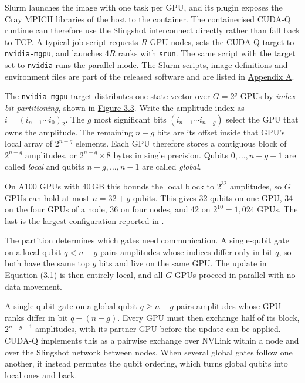 \documentclass{report}
\theoremstyle{plain}
\theoremstyle{definition}
\theoremstyle{remark}
\begin{document}
Slurm launches the image with one task per GPU, and its plugin exposes the Cray MPICH libraries of the host to the container. The containerised CUDA-Q runtime can therefore use the Slingshot interconnect directly rather than fall back to TCP. A typical job script requests $R$ GPU nodes, sets the CUDA-Q target to \texttt{nvidia-mgpu}, and launches $4R$ ranks with \texttt{srun}. The same script with the target set to \texttt{nvidia} runs the parallel mode. The Slurm scripts, image definitions and environment files are part of the released software \cite{guo2025qgearsoftware} and are listed in \hyperref[app:qgear]{Appendix A}.

The \texttt{nvidia-mgpu} target distributes one state vector over $G=2^{g}$ GPUs by \emph{index-bit partitioning}, shown in \hyperref[fig:qgear:partition]{Figure 3.3}. Write the amplitude index as $i=(i_{n-1}\cdots i_{0})_{2}$. The $g$ most significant bits $(i_{n-1}\cdots i_{n-g})$ select the GPU that owns the amplitude. The remaining $n-g$ bits are its offset inside that GPU's local array of $2^{n-g}$ elements. Each GPU therefore stores a contiguous block of $2^{n-g}$ amplitudes, or $2^{n-g}\times 8$ bytes in single precision. Qubits $0,\dots,n-g-1$ are called \emph{local} and qubits $n-g,\dots,n-1$ are called \emph{global}.

On A100 GPUs with 40 GB this bounds the local block to $2^{32}$ amplitudes, so $G$ GPUs can hold at most $n = 32+g$ qubits. This gives 32 qubits on one GPU, 34 on the four GPUs of a node, 36 on four nodes, and 42 on $2^{10}=1,024$ GPUs. The last is the largest configuration reported in \cite{guo2025qgear}.

The partition determines which gates need communication. A single-qubit gate on a local qubit $q<n-g$ pairs amplitudes whose indices differ only in bit $q$, so both have the same top $g$ bits and live on the same GPU. The update in \hyperref[eq:qgear:sqgate]{Equation (3.1)} is then entirely local, and all $G$ GPUs proceed in parallel with no data movement.

A single-qubit gate on a global qubit $q\geq n-g$ pairs amplitudes whose GPU ranks differ in bit $q-(n-g)$. Every GPU must then exchange half of its block, $2^{n-g-1}$ amplitudes, with its partner GPU before the update can be applied. CUDA-Q implements this as a pairwise exchange over NVLink within a node and over the Slingshot network between nodes. When several global gates follow one another, it instead permutes the qubit ordering, which turns global qubits into local ones and back.
\end{document}
